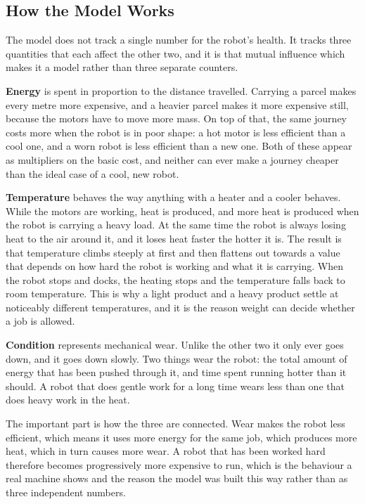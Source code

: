 \documentclass[12pt,a4paper]{report}
\begin{document}
\subsection{How the Model Works}
The model does not track a single number for the robot's health. It tracks three quantities that
each affect the other two, and it is that mutual influence which makes it a model rather than three
separate counters.

\textbf{Energy} is spent in proportion to the distance travelled. Carrying a parcel makes every
metre more expensive, and a heavier parcel makes it more expensive still, because the motors have
to move more mass. On top of that, the same journey costs more when the robot is in poor shape: a
hot motor is less efficient than a cool one, and a worn robot is less efficient than a new one.
Both of these appear as multipliers on the basic cost, and neither can ever make a journey cheaper
than the ideal case of a cool, new robot.

\textbf{Temperature} behaves the way anything with a heater and a cooler behaves. While the motors
are working, heat is produced, and more heat is produced when the robot is carrying a heavy load.
At the same time the robot is always losing heat to the air around it, and it loses heat faster the
hotter it is. The result is that temperature climbs steeply at first and then flattens out towards a
value that depends on how hard the robot is working and what it is carrying. When the robot stops
and docks, the heating stops and the temperature falls back to room temperature. This is why a
light product and a heavy product settle at noticeably different temperatures, and it is the reason
weight can decide whether a job is allowed.

\textbf{Condition} represents mechanical wear. Unlike the other two it only ever goes down, and it
goes down slowly. Two things wear the robot: the total amount of energy that has been pushed
through it, and time spent running hotter than it should. A robot that does gentle work for a long
time wears less than one that does heavy work in the heat.

The important part is how the three are connected. Wear makes the robot less efficient, which means
it uses more energy for the same job, which produces more heat, which in turn causes more wear. A
robot that has been worked hard therefore becomes progressively more expensive to run, which is the
behaviour a real machine shows and the reason the model was built this way rather than as three
independent numbers.
\end{document}
